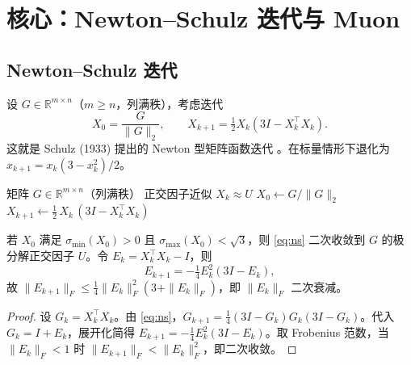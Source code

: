 \section{核心：Newton--Schulz 迭代与 Muon}
\label{sec:ns-muon}

\subsection{Newton--Schulz 迭代}

设 $G \in \mathbb{R}^{m\times n}$（$m \ge n$，列满秩），考虑迭代
\begin{equation}
  X_0 = \frac{G}{\|G\|_2},\qquad X_{k+1} = \tfrac{1}{2} X_k (3 I - X_k^\top X_k).
  \label{eq:ns}
\end{equation}
这就是 Schulz (1933) 提出的 Newton 型矩阵函数迭代 \cite{schulz1933,higham2008}。在标量情形下退化为 $x_{k+1} = x_k(3 - x_k^2)/2$。

\begin{algorithm}[htbp]
  \caption{Newton--Schulz 极分解迭代}
  \label{alg:ns}
  \begin{algorithmic}[1]
    \Require 矩阵 $G\in\mathbb{R}^{m\times n}$（列满秩）
    \Ensure 正交因子近似 $X_k \approx U$
    \State $X_0 \gets G / \|G\|_2$
      \State $X_{k+1} \gets \tfrac{1}{2}\, X_k \,(3I - X_k^\top X_k)$
    \EndFor
  \end{algorithmic}
\end{algorithm}

\begin{theorem}[局部二次收敛]
\label{thm:ns}
若 $X_0$ 满足 $\sigma_{\min}(X_0) > 0$ 且 $\sigma_{\max}(X_0) < \sqrt 3$，则 \eqref{eq:ns} 二次收敛到 $G$ 的极分解正交因子 $U$。令 $E_k = X_k^\top X_k - I$，则
\begin{equation}
  E_{k+1} = -\tfrac{1}{4} E_k^2 \left(3 I - E_k\right),
  \label{eq:ns-error}
\end{equation}
故 $\|E_{k+1}\|_F \le \tfrac{1}{4}\|E_k\|_F^2 (3 + \|E_k\|_F)$，即 $\|E_k\|_F$ 二次衰减。
\end{theorem}

\begin{proof}
设 $G_k = X_k^\top X_k$。由 \eqref{eq:ns}，$G_{k+1} = \tfrac{1}{4} (3 I - G_k) G_k (3 I - G_k)$。代入 $G_k = I + E_k$，展开化简得 $E_{k+1} = -\tfrac{1}{4} E_k^2 (3 I - E_k)$。取 Frobenius 范数，当 $\|E_k\|_F < 1$ 时 $\|E_{k+1}\|_F < \|E_k\|_F^2$，即二次收敛。
\end{proof}

